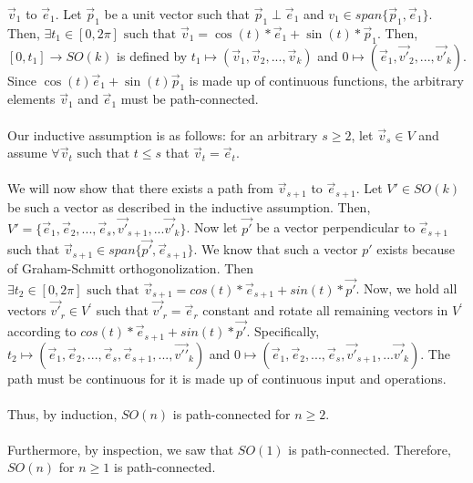 \documentclass{article}
\begin{document}
$\vec{v}_1$
to
$\vec{e}_1$.
Let
$\vec{p}_1$
be a unit vector such that
$\vec{p}_1 \perp \vec{e}_1$
and
$v_1 \in span\{\vec{p}_1, \vec{e}_1\}$.
Then,
$\exists t_1 \in [0, 2 \pi] \text{ such that } \vec{v}_1 = \cos (t) * \vec{e}_1 + \sin (t) * \vec{p}_1$.
Then,
$[0, t_1] \to SO(k)$
is defined by
$t_1 \mapsto (\vec{v}_1, \vec{v}_2, ..., \vec{v}_k)$
and
$0 \mapsto (\vec{e}_1, \vec{v\prime}_2, ..., \vec{v\prime}_k)$.
Since
$\cos (t) \vec{e}_1 + \sin (t) \vec{p}_1$
is made up of continuous functions, the arbitrary elements
$\vec{v}_1$
and
$\vec{e}_1$
must be path-connected. \\\\
Our inductive assumption is as follows: for an arbitrary
$s \geq 2$,
let
$\vec{v}_s \in V$
and assume
$\forall \vec{v}_t \text{ such that } t \leq s$
that
$\vec{v}_t = \vec{e}_t$. \\\\
We will now show that there exists a path from 
$\vec{v}_{s+1}$
to
$\vec{e}_{s+1}$.
Let
$V \prime \in SO(k)$
be such a vector as described in the inductive assumption. Then, 
$V \prime = \{ \vec{e}_1, \vec{e}_2, ... , \vec{e}_s, \vec{v\prime}_{s+1}, ... \vec{v\prime}_k \}$.
Now let
$\vec{p\prime}$
be a vector perpendicular to
$\vec{e}_{s+1}$
such that 
$\vec{v}_{s+1} \in span\{\vec{p\prime}, \vec{e}_{s+1}\}$.
We know that such a vector
$p\prime$
exists because of Graham-Schmitt orthogonolization. Then
$\exists t_2 \in [0, 2 \pi ] \text{ such that } \vec{v}_{s+1} = cos(t) * \vec{e}_{s+1} + sin(t) * \vec{p\prime}$.
Now, we hold all vectors
$\vec{v\prime}_r \in V^\prime$
such that
$\vec{v\prime}_r = \vec{e}_r$
constant and rotate all remaining vectors in
$V^\prime$ according to 
$cos(t) * \vec{e}_{s+1} + sin(t) * \vec{p\prime}$.
Specifically,
$t_2 \mapsto (\vec{e}_{1}, \vec{e}_2, ..., \vec{e}_s, \vec{e}_{s+1}, ... , \vec{v\prime \prime}_k)$
and
$0 \mapsto (\vec{e}_1, \vec{e}_2, ..., \vec{e}_s, \vec{v\prime}_{s+1}, ... \vec{v\prime}_k)$.
The path must be continuous for it is made up of continuous input and operations. \\\\
Thus, by induction,
$SO(n)$
is path-connected for
$n \geq 2$. \\\\
Furthermore, by inspection, we saw that
$SO(1)$
is path-connected. Therefore,
$SO(n)$
for
$n \geq 1$
is path-connected.

\newpage
\end{document}
